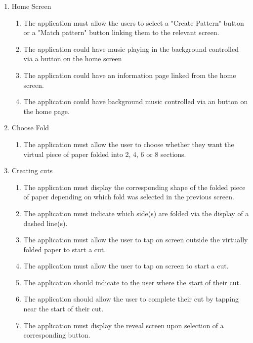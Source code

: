 \documentclass[11pt]{article}
\begin{document}
    \begin{enumerate}
      \item Home Screen
        \begin{enumerate}[label*=\arabic*.]
        \item The application must allow the users to select a "Create Pattern" button or a "Match pattern" button linking them to the relevant screen.
        \item The application could have music playing in the background controlled via a button on the home screen
        \item The application could have an information page linked from the home screen.
        \item The application could have background music controlled via an button on the home page.
      \end{enumerate}
      
       \item Choose Fold
        \begin{enumerate}[label*=\arabic*.]
        \item The application must allow the user to choose whether they want the virtual piece of paper folded into 2, 4, 6 or 8 sections.
      \end{enumerate}
      
      \item Creating cuts
      \begin{enumerate}[label*=\arabic*.]
        \item The application must display the corresponding shape of the folded piece of paper depending on which fold was selected in the previous screen.
        \item The application must indicate which side(s) are folded via the display of a dashed line(s).
        \item The application must allow the user to tap on screen outside the virtually folded paper to start a cut. 
        \item The application must allow the user to tap on screen to start a cut.
        \item The application should indicate to the user where the start of their cut.
        \item The application should allow the user to complete their cut by tapping near the start of their cut. 
        \item The application must display the reveal screen upon selection of a corresponding button.  
      \end{enumerate}
      

\end{enumerate}
\end{document}

